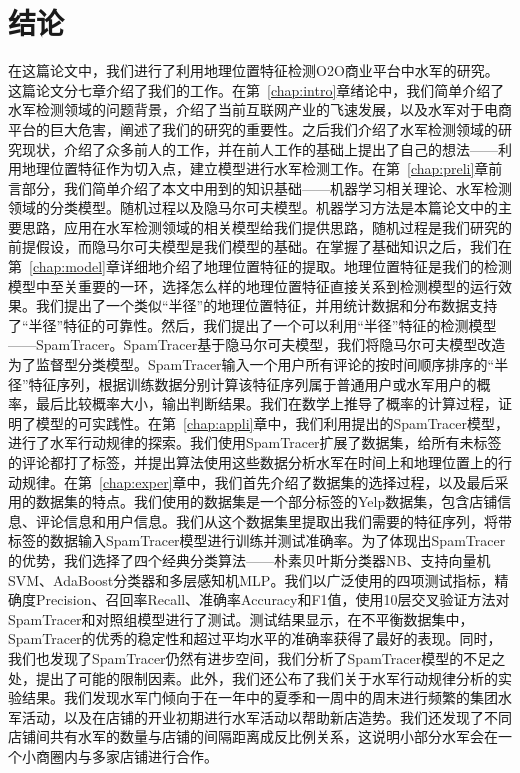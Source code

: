 
\chapter{结论}
\label{chap:concl}


在这篇论文中，我们进行了利用地理位置特征检测O2O商业平台中水军的研究。这篇论文分七章介绍了我们的工作。在第~\ref{chap:intro}章绪论中，我们简单介绍了水军检测领域的问题背景，介绍了当前互联网产业的飞速发展，以及水军对于电商平台的巨大危害，阐述了我们的研究的重要性。之后我们介绍了水军检测领域的研究现状，介绍了众多前人的工作，并在前人工作的基础上提出了自己的想法——利用地理位置特征作为切入点，建立模型进行水军检测工作。在第~\ref{chap:preli}章前言部分，我们简单介绍了本文中用到的知识基础——机器学习相关理论、水军检测领域的分类模型。随机过程以及隐马尔可夫模型。机器学习方法是本篇论文中的主要思路，应用在水军检测领域的相关模型给我们提供思路，随机过程是我们研究的前提假设，而隐马尔可夫模型是我们模型的基础。在掌握了基础知识之后，我们在第~\ref{chap:model}章详细地介绍了地理位置特征的提取。地理位置特征是我们的检测模型中至关重要的一环，选择怎么样的地理位置特征直接关系到检测模型的运行效果。我们提出了一个类似“半径”的地理位置特征，并用统计数据和分布数据支持了“半径”特征的可靠性。然后，我们提出了一个可以利用“半径”特征的检测模型——SpamTracer。SpamTracer基于隐马尔可夫模型，我们将隐马尔可夫模型改造为了监督型分类模型。SpamTracer输入一个用户所有评论的按时间顺序排序的“半径”特征序列，根据训练数据分别计算该特征序列属于普通用户或水军用户的概率，最后比较概率大小，输出判断结果。我们在数学上推导了概率的计算过程，证明了模型的可实践性。在第~\ref{chap:appli}章中，我们利用提出的SpamTracer模型，进行了水军行动规律的探索。我们使用SpamTracer扩展了数据集，给所有未标签的评论都打了标签，并提出算法使用这些数据分析水军在时间上和地理位置上的行动规律。在第~\ref{chap:exper}章中，我们首先介绍了数据集的选择过程，以及最后采用的数据集的特点。我们使用的数据集是一个部分标签的Yelp数据集，包含店铺信息、评论信息和用户信息。我们从这个数据集里提取出我们需要的特征序列，将带标签的数据输入SpamTracer模型进行训练并测试准确率。为了体现出SpamTracer的优势，我们选择了四个经典分类算法——朴素贝叶斯分类器NB、支持向量机SVM、AdaBoost分类器和多层感知机MLP。我们以广泛使用的四项测试指标，精确度Precision、召回率Recall、准确率Accuracy和F1值，使用10层交叉验证方法对SpamTracer和对照组模型进行了测试。测试结果显示，在不平衡数据集中，SpamTracer的优秀的稳定性和超过平均水平的准确率获得了最好的表现。同时，我们也发现了SpamTracer仍然有进步空间，我们分析了SpamTracer模型的不足之处，提出了可能的限制因素。此外，我们还公布了我们关于水军行动规律分析的实验结果。我们发现水军门倾向于在一年中的夏季和一周中的周末进行频繁的集团水军活动，以及在店铺的开业初期进行水军活动以帮助新店造势。我们还发现了不同店铺间共有水军的数量与店铺的间隔距离成反比例关系，这说明小部分水军会在一个小商圈内与多家店铺进行合作。
